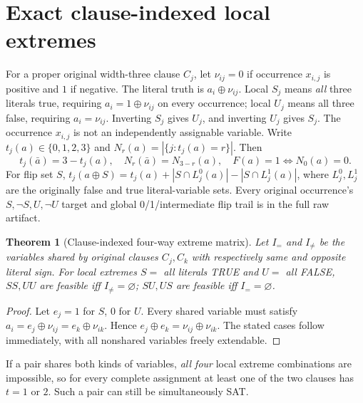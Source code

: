 \documentclass[10pt]{article}
\newtheorem{theorem}{Theorem}
\begin{document}
\section{Exact clause-indexed local extremes}
For a proper original width-three clause \(C_j\), let \(\nu_{ij}=0\) if occurrence \(x_{i,j}\) is positive and \(1\) if negative. The literal truth is \(a_i\oplus\nu_{ij}\). Local \(S_j\) means \emph{all} three literals true, requiring \(a_i=1\oplus\nu_{ij}\) on every occurrence; local \(U_j\) means all three false, requiring \(a_i=\nu_{ij}\). Inverting \(S_j\) gives \(U_j\), and inverting \(U_j\) gives \(S_j\). The occurrence \(x_{i,j}\) is not an independently assignable variable.
Write \(t_j(a)\in\{0,1,2,3\}\) and \(N_r(a)=|\{j:t_j(a)=r\}|\). Then
\[
t_j(\bar a)=3-t_j(a),\quad N_r(\bar a)=N_{3-r}(a),\quad
F(a)=1\Longleftrightarrow N_0(a)=0 .
\]
For flip set \(S\), \(t_j(a\oplus S)=t_j(a)+|S\cap L_j^0(a)|-|S\cap L_j^1(a)|\), where \(L_j^0,L_j^1\) are the originally false and true literal-variable sets. Every original occurrence's \(S,\neg S,U,\neg U\) target and global 0/1/intermediate flip trail is in the full raw artifact.
\begin{theorem}[Clause-indexed four-way extreme matrix]
Let \(I_=\) and \(I_{\ne}\) be the variables shared by original clauses \(C_j,C_k\) with respectively same and opposite literal sign. For local extremes \(S=\) all literals TRUE and \(U=\) all FALSE, \(SS,UU\) are feasible iff \(I_{\ne}=\varnothing\); \(SU,US\) are feasible iff \(I_==\varnothing\).
\end{theorem}
\begin{proof} Let \(e_j=1\) for \(S\), \(0\) for \(U\). Every shared variable must satisfy \(a_i=e_j\oplus\nu_{ij}=e_k\oplus\nu_{ik}\). Hence \(e_j\oplus e_k=\nu_{ij}\oplus\nu_{ik}\). The stated cases follow immediately, with all nonshared variables freely extendable. \end{proof}
If a pair shares both kinds of variables, \emph{all four} local extreme combinations are impossible, so for every complete assignment at least one of the two clauses has \(t=1\) or \(2\). Such a pair can still be simultaneously SAT.
\end{document}
